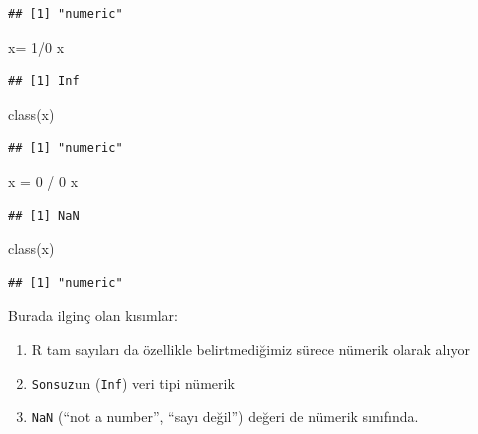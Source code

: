 \documentclass[
]{book}
\newenvironment{Shaded}{\begin{snugshade}}{\end{snugshade}}
\newcommand{\DecValTok}[1]{\textcolor[rgb]{0.00,0.00,0.81}{#1}}
\newcommand{\FunctionTok}[1]{\textcolor[rgb]{0.00,0.00,0.00}{#1}}
\newcommand{\NormalTok}[1]{#1}
\newcommand{\OtherTok}[1]{\textcolor[rgb]{0.56,0.35,0.01}{#1}}
\newcommand{\SpecialCharTok}[1]{\textcolor[rgb]{0.00,0.00,0.00}{#1}}
\providecommand{\tightlist}{%
  \setlength{\itemsep}{0pt}\setlength{\parskip}{0pt}}
\begin{document}
\begin{verbatim}
## [1] "numeric"
\end{verbatim}

\begin{Shaded}
\begin{Highlighting}[]
\NormalTok{x}\OtherTok{=} \DecValTok{1}\SpecialCharTok{/}\DecValTok{0}
\NormalTok{x}
\end{Highlighting}
\end{Shaded}

\begin{verbatim}
## [1] Inf
\end{verbatim}

\begin{Shaded}
\begin{Highlighting}[]
\FunctionTok{class}\NormalTok{(x)}
\end{Highlighting}
\end{Shaded}

\begin{verbatim}
## [1] "numeric"
\end{verbatim}

\begin{Shaded}
\begin{Highlighting}[]
\NormalTok{x }\OtherTok{=} \DecValTok{0} \SpecialCharTok{/} \DecValTok{0}
\NormalTok{x}
\end{Highlighting}
\end{Shaded}

\begin{verbatim}
## [1] NaN
\end{verbatim}

\begin{Shaded}
\begin{Highlighting}[]
\FunctionTok{class}\NormalTok{(x)}
\end{Highlighting}
\end{Shaded}

\begin{verbatim}
## [1] "numeric"
\end{verbatim}

Burada ilginç olan kısımlar:

\begin{enumerate}
\def\labelenumi{\arabic{enumi}.}
\tightlist
\item
  R tam sayıları da özellikle belirtmediğimiz sürece nümerik olarak alıyor
\item
  \texttt{Sonsuz}un (\texttt{Inf}) veri tipi nümerik
\item
  \texttt{NaN} (``not a number'', ``sayı değil'') değeri de nümerik sınıfında.
\end{enumerate}
\end{document}
